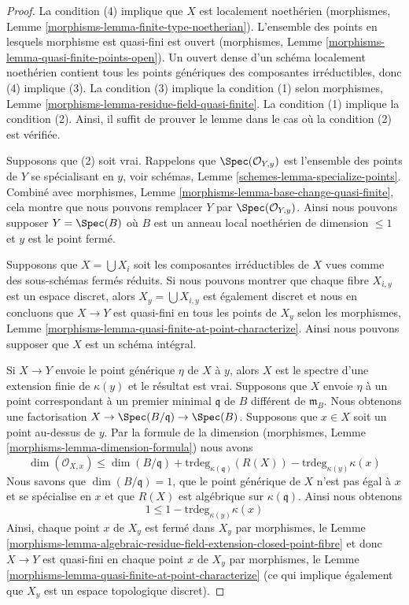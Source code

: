 \begin{proof}
La condition (4) implique que $X$ est localement noethérien
(morphismes, Lemme \ref{morphisms-lemma-finite-type-noetherian}).
L'ensemble des points en lesquels morphisme est quasi-fini est
ouvert (morphismes, Lemme
\ref{morphisms-lemma-quasi-finite-points-open}). Un ouvert dense d'un
schéma localement noethérien contient tous les points génériques des
composantes irréductibles, donc (4) implique (3). La condition (3)
implique la condition (1) selon morphismes, Lemme
\ref{morphisms-lemma-residue-field-quasi-finite}. La condition (1) implique la condition
(2). Ainsi, il suffit de prouver le lemme dans le cas où la condition (2) est vérifiée.

\medskip\noindent
Supposons que (2) soit vrai. Rappelons que
$\Spec(\mathcal{O}_{Y, y})$ est l'ensemble des points de $Y$
se spécialisant en $y$, voir schémas, Lemme
\ref{schemes-lemma-specialize-points}. Combiné avec morphismes,
Lemme \ref{morphisms-lemma-base-change-quasi-finite}, cela montre
que nous pouvons remplacer $Y$ par $\Spec(\mathcal{O}_{Y, y})$.
Ainsi nous pouvons supposer $Y = \Spec(B)$ où $B$ est un anneau
local noethérien de dimension $\leq 1$ et $y$ est le point fermé.

\medskip\noindent
Supposons que $X = \bigcup X_i$ soit les composantes irréductibles
de $X$ vues comme des sous-schémas fermés réduits. Si nous pouvons
montrer que chaque fibre $X_{i, y}$ est un espace discret, alors
$X_y = \bigcup X_{i, y}$ est également discret et nous en concluons
que $X \to Y$ est quasi-fini en tous les points de $X_y$ selon les
morphismes, Lemme
\ref{morphisms-lemma-quasi-finite-at-point-characterize}. Ainsi nous pouvons supposer que $X$ est un schéma intégral.

\medskip\noindent
Si $X \to Y$ envoie le point générique $\eta$ de $X$ à
$y$, alors $X$ est le spectre d'une extension finie de
$\kappa(y)$ et le résultat est vrai. Supposons que $X$
envoie $\eta$ à un point correspondant à un premier
minimal $\mathfrak q$ de $B$ différent de $\mathfrak m_B$.
Nous obtenons une factorisation $X \to \Spec(B/\mathfrak
q) \to \Spec(B)$. Supposons que $x \in X$ soit un point
au-dessus de $y$. Par la formule de la dimension
(morphismes, Lemme \ref{morphisms-lemma-dimension-formula}) nous avons
$$
\dim(\mathcal{O}_{X, x}) \leq \dim(B/\mathfrak q) +
\text{trdeg}_{\kappa(\mathfrak q)}(R(X)) - \text{trdeg}_{\kappa(y)} \kappa(x)
$$
Nous savons que $\dim(B/\mathfrak q) = 1$, que le point
générique de $X$ n'est pas égal à $x$ et se spécialise en $x$ et que
$R(X)$ est algébrique sur $\kappa(\mathfrak q)$. Ainsi nous obtenons
$$
1 \leq 1 - \text{trdeg}_{\kappa(y)} \kappa(x)
$$
Ainsi, chaque point $x$ de $X_y$ est fermé dans $X_y$ par
morphismes, le Lemme
\ref{morphisms-lemma-algebraic-residue-field-extension-closed-point-fibre}
et donc $X \to Y$ est quasi-fini en chaque point $x$ de $X_y$ par
morphismes, le Lemme
\ref{morphisms-lemma-quasi-finite-at-point-characterize} (ce qui implique également que $X_y$ est un espace topologique discret).
\end{proof}

